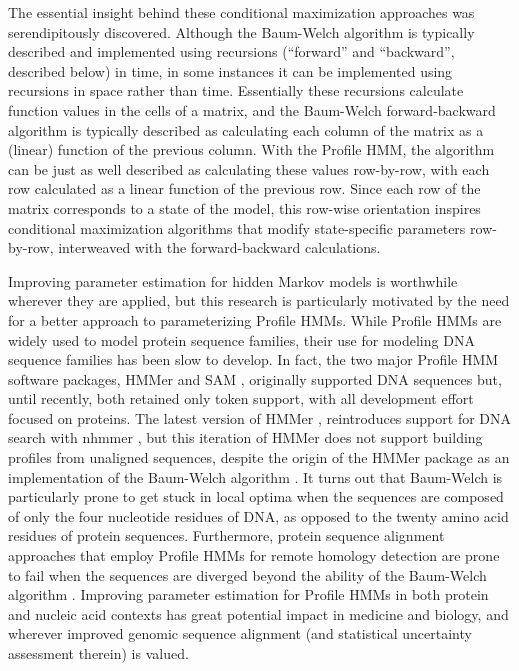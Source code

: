 \documentclass[preprint,12pt,authoryear]{elsarticle}
\begin{document}
The essential insight behind these conditional maximization approaches
was serendipitously discovered.  Although the Baum-Welch algorithm is
typically described and implemented using recursions (``forward'' and
``backward'', described below) in time, in some instances it can be
implemented using recursions in space rather than time.  Essentially
these recursions calculate function values in the cells of a matrix, and the Baum-Welch forward-backward algorithm is typically described as calculating each column of the matrix as a (linear) function of the previous column.  With the Profile HMM, the algorithm can be just as well described as calculating these values row-by-row, with each row calculated as a linear function of the previous row.  Since each row of the matrix corresponds to a state of the model, this row-wise orientation inspires conditional maximization algorithms that modify state-specific parameters row-by-row, interweaved with the forward-backward calculations.

Improving parameter estimation for hidden Markov models is worthwhile
wherever they are applied, but this research is particularly motivated
by the need for a better approach to parameterizing Profile HMMs.
While Profile HMMs are widely used to model protein sequence families,
their use for modeling DNA sequence families has been slow to develop.
In fact, the two major Profile HMM software packages, HMMer
\citep{eddy:1992} and SAM \citep{SAM,hughey:1996}, originally supported
DNA sequences but, until recently, both retained only token support, with all development
effort focused on proteins.  The latest version of HMMer \citep[version 3.1:][]{HMMerUsersGuide3.1,FinnHMMer3}, reintroduces support for DNA search with nhmmer \citep{Wheeler2013}, but this iteration of HMMer does not support building profiles from unaligned sequences, despite the origin of the HMMer package as an implementation of the Baum-Welch algorithm \citep{Durbin}.  It turns out that Baum-Welch is 
particularly prone to get stuck in local optima when the sequences are
composed of only the four nucleotide residues of DNA, as opposed to
the twenty amino acid residues of protein sequences.  Furthermore,
protein sequence alignment approaches that employ Profile HMMs
for remote homology detection are prone to fail when the sequences are
diverged beyond the ability of the Baum-Welch algorithm \citep{kececioglu2010aligning}.  Improving
parameter estimation for Profile HMMs in both protein and nucleic acid
contexts has great potential impact in medicine and
biology, and wherever improved genomic sequence alignment (and statistical uncertainty assessment therein) is valued.
\end{document}
